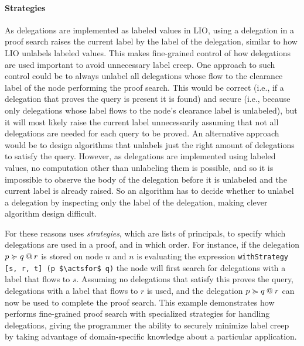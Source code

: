 \paragraph{Strategies}
As delegations are implemented as labeled values in LIO, using a delegation in a proof search raises the current label by the label of the delegation, similar to how LIO unlabels labeled values. This makes fine-grained control of how delegations are used important to avoid unnecessary label creep.
One approach to such control could be to always unlabel all delegations whose flow to the clearance label of the node performing the proof search. This would be correct (i.e., if a delegation that proves the query is present it is found) and secure (i.e., because only delegations whose label flows to the node's clearance label is unlabeled), but it will most likely raise the current label unnecessarily assuming that not all delegations are needed for each query to be proved.
An alternative approach would be to design algorithms that unlabels just the right amount of delegations to satisfy the query. However, as delegations are implemented using labeled values, no computation other than unlabeling them is possible, and so it is impossible to observe the body of the delegation before it is unlabeled and the current label is already raised. So an algorithm has to decide whether to unlabel a delegation by inspecting only the label of the delegation, making clever algorithm design difficult.

For these reasons \lang{} uses \emph{strategies}, which are lists of principals, to specify which delegations are used in a proof, and in which order. For instance, if the delegation $\lb{r}{p \actsfor q}$ is stored on node $n$ and $n$ is evaluating the expression \lstinline[mathescape]!withStrategy [s, r, t] (p $\actsfor$ q)! the node will first search for delegations with a label that flows to $s$. Assuming no delegations that satisfy this proves the query, delegations with a label that flows to $r$ is used, and the delegation $\lb{r}{p \actsfor q}$ can now be used to complete the proof search. This example demonstrates how \lang{} performs fine-grained proof search with specialized strategies for handling delegations, giving the programmer the ability to securely minimize label creep by taking advantage of domain-specific knowledge about a particular application.

